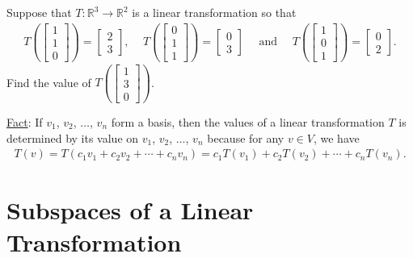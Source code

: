 \documentclass[12pt,a4paper]{article}
\newcounter{example}[section]
\begin{document}
	\begin{example}
	Suppose that $T : \mathbb{R}^3 \rightarrow \mathbb{R}^2$ is a linear transformation so that
		\begin{align*}
		T \left( \begin{bmatrix}
		1 \\ 1 \\ 0
		\end{bmatrix} \right) = \begin{bmatrix}
		2 \\ 3
		\end{bmatrix}
		\text{, } \quad
		T \left( \begin{bmatrix}
		0 \\ 1 \\ 1
		\end{bmatrix} \right) = \begin{bmatrix}
		0 \\ 3
		\end{bmatrix}
		\quad \text{ and } \quad
		T \left( \begin{bmatrix}
		1 \\ 0 \\ 1
		\end{bmatrix} \right) = \begin{bmatrix}
		0 \\ 2
		\end{bmatrix} .
		\end{align*}
	Find the value of $T \left( \begin{bmatrix}
		1 \\ 3 \\ 0
		\end{bmatrix} \right) $. 
	\end{example}
	
	\vfill
	
	\underline{Fact}: If $v_1$, $v_2$, $\ldots$, $v_n$ form a basis, then the values of a linear transformation $T$ is determined by its value on $v_1$, $v_2$, $\ldots$, $v_n$ because for any $v \in V$, we have
		\begin{align*}
		T(v) = T(c_1 v_1 + c_2 v_2 + \cdots + c_n v_n) = c_1 T(v_1 ) + c_2 T(v_2) + \cdots + c_n T(v_n) .
		\end{align*}
		
	\newpage
		
	\section{Subspaces of a Linear Transformation}
	
\end{document}
